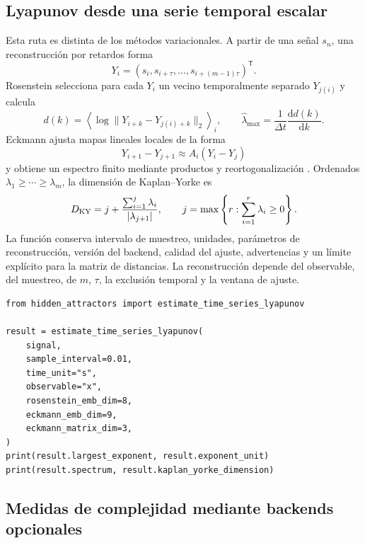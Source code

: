\subsection{Lyapunov desde una serie temporal escalar}

Esta ruta es distinta de los métodos variacionales. A partir de una señal
\(s_n\), una reconstrucción por retardos forma \cite{Takens1981}
\[
 Y_i=(s_i,s_{i+\tau},\ldots,s_{i+(m-1)\tau})^\mathsf{T}.
\]
Rosenstein selecciona para cada \(Y_i\) un vecino temporalmente separado
\(Y_{j(i)}\) y calcula \cite{Rosenstein1993}
\[
 d(k)=\left\langle
 \log\|Y_{i+k}-Y_{j(i)+k}\|_2
 \right\rangle_i,\qquad
 \widehat\lambda_{\max}=
 \frac1{\Delta t}\frac{\mathrm d d(k)}{\mathrm d k}.
\]
Eckmann ajusta mapas lineales locales de la forma
\[
 Y_{i+1}-Y_{j+1}\approx
 A_i(Y_i-Y_j)
\]
y obtiene un espectro finito mediante productos y
reortogonalización \cite{Eckmann1986}. Ordenados
\(\lambda_1\geq\cdots\geq\lambda_m\), la dimensión de Kaplan--Yorke es
\cite{Frederickson1983}
\[
 D_{\rm KY}=j+
 \frac{\sum_{i=1}^{j}\lambda_i}{|\lambda_{j+1}|},
 \qquad
 j=\max\left\{r:\sum_{i=1}^{r}\lambda_i\geq0\right\}.
\]
La función conserva intervalo de muestreo, unidades, parámetros de
reconstrucción, versión del backend, calidad del ajuste, advertencias y un
límite explícito para la matriz de distancias. La reconstrucción depende del
observable, del muestreo, de \(m\), \(\tau\), la exclusión temporal y la
ventana de ajuste.

\begin{verbatim}
from hidden_attractors import estimate_time_series_lyapunov

result = estimate_time_series_lyapunov(
    signal,
    sample_interval=0.01,
    time_unit="s",
    observable="x",
    rosenstein_emb_dim=8,
    eckmann_emb_dim=9,
    eckmann_matrix_dim=3,
)
print(result.largest_exponent, result.exponent_unit)
print(result.spectrum, result.kaplan_yorke_dimension)
\end{verbatim}

\subsection{Medidas de complejidad mediante backends opcionales}

